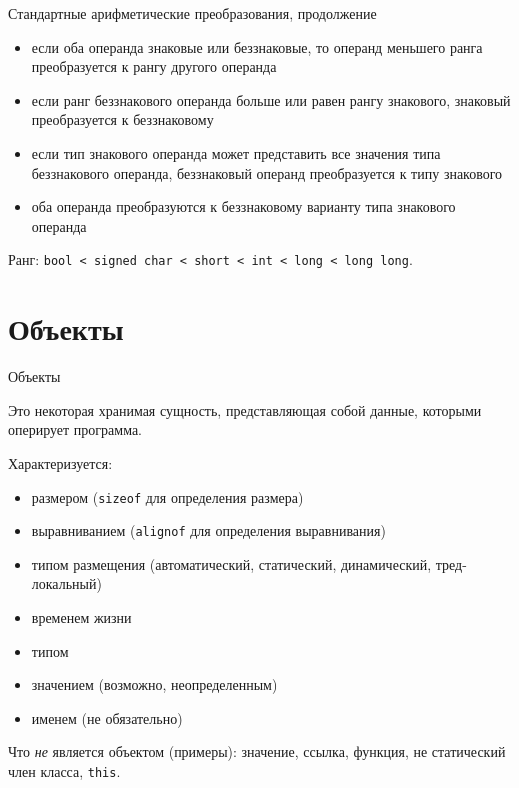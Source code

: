 \documentclass[unknownkeysallowed,xcolor=table]{beamer}
\begin{document}
\begin{frame}{Стандартные арифметические преобразования, продолжение}

\begin{itemize}
  \item если оба операнда знаковые или беззнаковые, то операнд меньшего ранга преобразуется к рангу другого операнда \vspace{0.5em}
  \item если ранг беззнакового операнда больше или равен рангу знакового, знаковый преобразуется к беззнаковому \vspace{0.5em}
  \item если тип знакового операнда может представить все значения типа беззнакового операнда, беззнаковый операнд преобразуется к типу знакового \vspace{0.5em}
  \item оба операнда преобразуются к беззнаковому варианту типа знакового операнда
\end{itemize}
\vspace{0.5em}

Ранг: \lstinline{bool < signed char < short < int < long < long long}.

\end{frame}


\section{Объекты}

\begin{frame}{Объекты}

Это некоторая хранимая сущность, представляющая собой данные, которыми оперирует программа.

Характеризуется:
\begin{itemize}
  \item размером (\lstinline[basicstyle=\ttfamily\small]{sizeof} для определения размера)
  \item выравниванием (\lstinline[basicstyle=\ttfamily\small]{alignof} для определения выравнивания)
  \item типом размещения (автоматический, статический, динамический, тред-локальный)
  \item временем жизни
  \item типом
  \item значением (возможно, неопределенным)
  \item именем (не обязательно)
\end{itemize}

Что \emph{не} является объектом (примеры): значение, ссылка, функция, не статический член класса, \lstinline[basicstyle=\ttfamily\small]{this}.

\end{frame}
\end{document}
